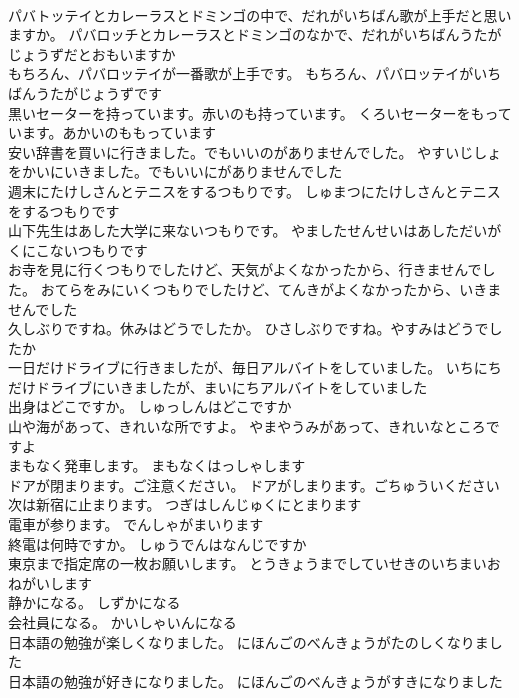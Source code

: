 \documentclass[8pt]{extreport}
\begin{document}
\begin{CJK}{UTF8}{min}
\\	パバトッテイとカレーラスとドミンゴの中で、だれがいちばん歌が上手だと思いますか。	パバロッチとカレーラスとドミンゴのなかで、だれがいちばんうたがじょうずだとおもいますか 
\\	もちろん、パバロッテイが一番歌が上手です。	もちろん、パバロッテイがいちばんうたがじょうずです 
\\	黒いセーターを持っています。赤いのも持っています。	くろいセーターをもっています。あかいのももっています 
\\	安い辞書を買いに行きました。でもいいのがありませんでした。	やすいじしょをかいにいきました。でもいいにがありませんでした 
\\	週末にたけしさんとテニスをするつもりです。	しゅまつにたけしさんとテニスをするつもりです 
\\	山下先生はあした大学に来ないつもりです。	やましたせんせいはあしただいがくにこないつもりです 
\\	お寺を見に行くつもりでしたけど、天気がよくなかったから、行きませんでした。	おてらをみにいくつもりでしたけど、てんきがよくなかったから、いきませんでした 
\\	久しぶりですね。休みはどうでしたか。	ひさしぶりですね。やすみはどうでしたか 
\\	一日だけドライブに行きましたが、毎日アルバイトをしていました。	いちにちだけドライブにいきましたが、まいにちアルバイトをしていました 
\\	出身はどこですか。	しゅっしんはどこですか 
\\	山や海があって、きれいな所ですよ。	やまやうみがあって、きれいなところですよ 
\\	まもなく発車します。	まもなくはっしゃします 
\\	ドアが閉まります。ご注意ください。	ドアがしまります。ごちゅういください 
\\	次は新宿に止まります。	つぎはしんじゅくにとまります 
\\	電車が参ります。	でんしゃがまいります 
\\	終電は何時ですか。	しゅうでんはなんじですか 
\\	東京まで指定席の一枚お願いします。	とうきょうまでしていせきのいちまいおねがいします 
\\	静かになる。	しずかになる 
\\	会社員になる。	かいしゃいんになる 
\\	日本語の勉強が楽しくなりました。	にほんごのべんきょうがたのしくなりました 
\\	日本語の勉強が好きになりました。	にほんごのべんきょうがすきになりました 

\end{CJK}
\end{document}
